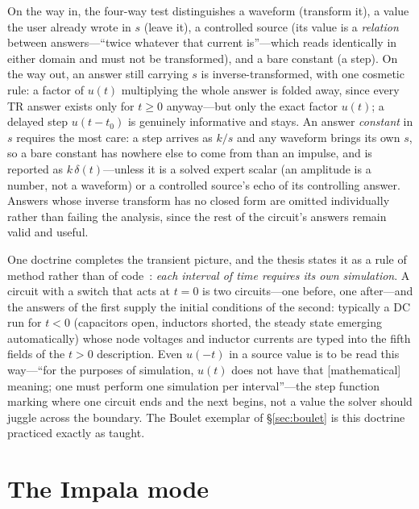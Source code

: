 \documentclass[11pt,oneside]{report}
\begin{document}
On the way in, the four-way test distinguishes a waveform (transform
it), a value the user already wrote in $s$ (leave it), a controlled
source (its value is a \emph{relation} between answers---``twice
whatever that current is''---which reads identically in either domain
and must not be transformed), and a bare constant (a step). On the way
out, an answer still carrying $s$ is inverse-transformed, with one
cosmetic rule: a factor of $u(t)$ multiplying the whole answer is
folded away, since every TR answer exists only for $t \ge 0$
anyway---but only the exact factor $u(t)$; a delayed step $u(t-t_0)$
is genuinely informative and stays. An answer \emph{constant} in $s$
requires the most care: a step arrives as $k/s$ and any waveform
brings its own $s$, so a bare constant has nowhere else to come from
than an impulse, and is reported as $k\,\delta(t)$---unless it is a
solved expert scalar (an amplitude is a number, not a waveform) or a
controlled source's echo of its controlling answer. Answers whose
inverse transform has no closed form are omitted individually rather
than failing the analysis, since the rest of the circuit's answers
remain valid and useful.

One doctrine completes the transient picture, and the thesis states
it as a rule of method rather than of code~\cite[\S11.10]{thesis2000}:
\emph{each interval of time requires its own simulation}. A circuit
with a switch that acts at $t=0$ is two circuits---one before, one
after---and the answers of the first supply the initial conditions
of the second: typically a DC run for $t<0$ (capacitors open,
inductors shorted, the steady state emerging automatically) whose
node voltages and inductor currents are typed into the fifth fields
of the $t>0$ description. Even $u(-t)$ in a source value is to be
read this way---``for the purposes of simulation, $u(t)$ does not
have that [mathematical] meaning; one must perform one simulation
per interval''---the step function marking where one circuit ends
and the next begins, not a value the solver should juggle across the
boundary. The Boulet exemplar of \S\ref{sec:boulet} is this doctrine
practiced exactly as taught.

\section{The Impala mode}
\label{sec:impala}
\end{document}
